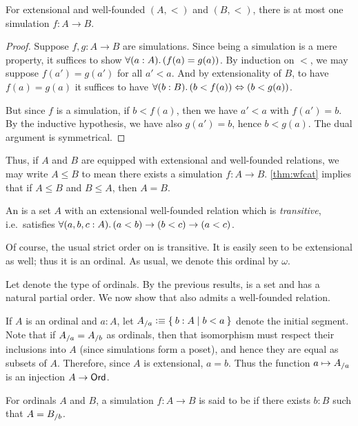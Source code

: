 \begin{lem}
  For extensional and well-founded $(A,<)$ and $(B,<)$, there is at most one simulation $f:A\to B$.
\end{lem}
\begin{proof}
  Suppose $f,g:A\to B$ are simulations.
  Since being a simulation is a mere property, it suffices to show $\fall{a:A}(f(a)=g(a))$.
  By induction on $<$, we may suppose $f(a')=g(a')$ for all $a'<a$.
  And by extensionality of $B$, to have $f(a)=g(a)$ it suffices to have $\fall{b:B}(b<f(a)) \Leftrightarrow (b<g(a))$.

  But since $f$ is a simulation, if $b<f(a)$, then we have $a'<a$ with $f(a')=b$.
  By the inductive hypothesis, we have also $g(a')=b$, hence $b<g(a)$.
  The dual argument is symmetrical.
\end{proof}

Thus, if $A$ and $B$ are equipped with extensional and well-founded relations, we may write $A\le B$ to mean there exists a simulation $f:A\to B$.
\cref{thm:wfcat} implies that if $A\le B$ and $B\le A$, then $A=B$.

\begin{defn}
  An 
  is a set $A$ with an extensional well-founded relation which is \emph{transitive}, i.e.\ satisfies $\fall{a,b,c:A}(a<b)\to (b<c) \to (a<c)$.
\end{defn}

\begin{eg}
  Of course, the usual strict order on \nat is transitive.
  It is easily seen to be extensional as well; thus it is an ordinal.
  As usual, we denote this ordinal by $\omega$.
\end{eg}

Let \ord denote the type of ordinals.
By the previous results, \ord is a set and has a natural partial order.
We now show that \ord also admits a well-founded relation.

If $A$ is an ordinal and $a:A$, let ${A}_{/a} \vcentcolon\equiv \Set{ b:A | b<a}$ denote the initial segment.
%
Note that if ${A}_{/a} = {A}_{/b}$ as ordinals, then that isomorphism must respect their inclusions into $A$ (since simulations form a poset), and hence they are equal as subsets of $A$.
Therefore, since $A$ is extensional, $a=b$.
Thus the function $a\mapsto {A}_{/a}$ is an injection $A\to \mathsf{Ord}$.

\begin{defn}
  For ordinals $A$ and $B$, a simulation $f:A\to B$ is said to be 
  if there exists $b:B$ such that $A = {B}_{/b}$.
\end{defn}

